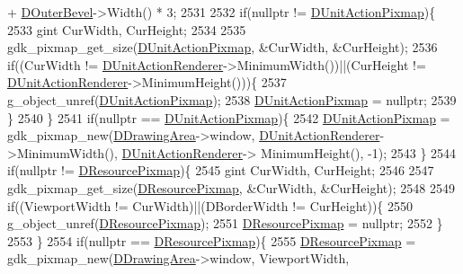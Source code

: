 \begin{DoxyCode}
{       + \hyperlink{classCApplicationData_abc2b04aa05148da81145ff6d6bc2bf01}{DOuterBevel}->Width() * 3;
2531     
2532     \textcolor{keywordflow}{if}(\textcolor{keyword}{nullptr} != \hyperlink{classCApplicationData_ae264356c833cd581093e3b373cce6620}{DUnitActionPixmap})\{
2533         gint CurWidth, CurHeight;
2534         
2535         gdk\_pixmap\_get\_size(\hyperlink{classCApplicationData_ae264356c833cd581093e3b373cce6620}{DUnitActionPixmap}, &CurWidth, &CurHeight);
2536         \textcolor{keywordflow}{if}((CurWidth != \hyperlink{classCApplicationData_a5aca1f832dd6387662f0d4441745cf6f}{DUnitActionRenderer}->MinimumWidth())||(CurHeight != 
      \hyperlink{classCApplicationData_a5aca1f832dd6387662f0d4441745cf6f}{DUnitActionRenderer}->MinimumHeight()))\{
2537             g\_object\_unref(\hyperlink{classCApplicationData_ae264356c833cd581093e3b373cce6620}{DUnitActionPixmap});
2538             \hyperlink{classCApplicationData_ae264356c833cd581093e3b373cce6620}{DUnitActionPixmap} = \textcolor{keyword}{nullptr};
2539         \}
2540     \}
2541     \textcolor{keywordflow}{if}(\textcolor{keyword}{nullptr} == \hyperlink{classCApplicationData_ae264356c833cd581093e3b373cce6620}{DUnitActionPixmap})\{
2542         \hyperlink{classCApplicationData_ae264356c833cd581093e3b373cce6620}{DUnitActionPixmap} = gdk\_pixmap\_new(\hyperlink{classCApplicationData_a4735f5d31632313e0b2a1659eb178987}{DDrawingArea}->window, 
      \hyperlink{classCApplicationData_a5aca1f832dd6387662f0d4441745cf6f}{DUnitActionRenderer}->MinimumWidth(), \hyperlink{classCApplicationData_a5aca1f832dd6387662f0d4441745cf6f}{DUnitActionRenderer}->
      MinimumHeight(), -1);
2543     \}
2544     \textcolor{keywordflow}{if}(\textcolor{keyword}{nullptr} != \hyperlink{classCApplicationData_aa9faf270fb2d769855fa5d787a883a83}{DResourcePixmap})\{
2545         gint CurWidth, CurHeight;
2546         
2547         gdk\_pixmap\_get\_size(\hyperlink{classCApplicationData_aa9faf270fb2d769855fa5d787a883a83}{DResourcePixmap}, &CurWidth, &CurHeight); 
2548         
2549         \textcolor{keywordflow}{if}((ViewportWidth != CurWidth)||(DBorderWidth != CurHeight))\{
2550             g\_object\_unref(\hyperlink{classCApplicationData_aa9faf270fb2d769855fa5d787a883a83}{DResourcePixmap});
2551             \hyperlink{classCApplicationData_aa9faf270fb2d769855fa5d787a883a83}{DResourcePixmap} = \textcolor{keyword}{nullptr};
2552         \}  
2553     \}
2554     \textcolor{keywordflow}{if}(\textcolor{keyword}{nullptr} == \hyperlink{classCApplicationData_aa9faf270fb2d769855fa5d787a883a83}{DResourcePixmap})\{
2555         \hyperlink{classCApplicationData_aa9faf270fb2d769855fa5d787a883a83}{DResourcePixmap} = gdk\_pixmap\_new(\hyperlink{classCApplicationData_a4735f5d31632313e0b2a1659eb178987}{DDrawingArea}->window, ViewportWidth, 
}
\end{DoxyCode}
